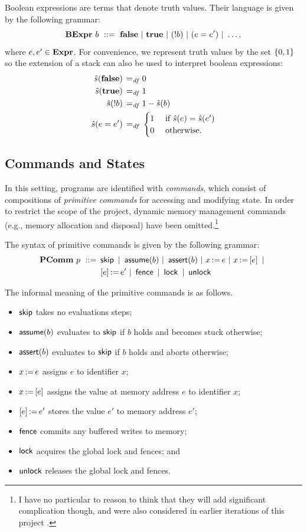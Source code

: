 \documentclass[11pt]{article}
\begin{document}
Boolean expressions are terms that denote truth values. Their language is given by the following grammar: \[ \mathbf{BExpr}~b ~::=~ \mathbf{false} ~|~ \mathbf{true} ~|~ (!b) ~|~ (e = e') ~|~ \ldots, \] where $e,e' \in \mathbf{Expr}$. For convenience, we represent truth values by the set $\left\lbrace 0,1 \right\rbrace$ so the extension of a stack can also be used to interpret boolean expressions: \begin{align*}
	\hat{s}(\mathbf{false}) \operatorname{\;=_{\mathit{df}}\;} & 0 \\
	\hat{s}(\mathbf{true}) \operatorname{\;=_{\mathit{df}}\;} & 1 \\
	\hat{s}(!b) \operatorname{\;=_{\mathit{df}}\;} & 1 - \hat{s}(b) \\
	\hat{s}(e = e') \operatorname{\;=_{\mathit{df}}\;} & \begin{cases}
		1 &\text{ if } \hat{s}(e) = \hat{s}(e')\\
		0 &\text{ otherwise.}
	\end{cases}
\end{align*}

\subsection{Commands and States}

In this setting, programs are identified with \emph{commands}, which consist of compositions of \emph{primitive commands} for accessing and modifying state. In order to restrict the scope of the project, dynamic memory management commands (e.g., memory allocation and disposal) have been omitted.\footnote{I have no particular to reason to think that they will add significant complication though, and were also considered in earlier iterations of this project \cite{wmsldetails,lola11}.}

The syntax of primitive commands is given by the following grammar: \begin{align*} \mathbf{PComm}~p ~::=~ & \operatorname{\mathsf{skip}} ~|~ \operatorname{\mathsf{assume}}(b) ~|~ \operatorname{\mathsf{assert}}(b) ~|~ x \operatorname{:\!=} e ~|~ x \operatorname{:\!=} \left[ e \right] ~|~ \\ 
	& \left[ e \right] \operatorname{:\!=} e' ~|~ \operatorname{\mathsf{fence}} ~|~ \operatorname{\mathsf{lock}} ~|~ \operatorname{\mathsf{unlock}} 	
\end{align*}

The informal meaning of the primitive commands is as follows. \begin{itemize}
	\item $\operatorname{\mathsf{skip}}$ takes no evaluations steps;
	\item $\operatorname{\mathsf{assume}}(b)$ evaluates to $\operatorname{\mathsf{skip}}$ if $b$ holds and becomes stuck otherwise; 
	\item $\operatorname{\mathsf{assert}}(b)$ evaluates to $\operatorname{\mathsf{skip}}$ if $b$ holds and aborts otherwise;
	\item $x \operatorname{:\!=} e$ assigns $e$ to identifier $x$; 
	\item $x \operatorname{:\!=} \left[ e \right]$ assigns the value at memory address $e$ to identifier $x$; 
	\item $\left[ e \right] \operatorname{:\!=} e'$ stores the value $e'$ to memory address $e'$; 
	\item $\operatorname{\mathsf{fence}}$ commits any buffered writes to memory; 
	\item $\operatorname{\mathsf{lock}}$ acquires the global lock and fences; and
	\item $\operatorname{\mathsf{unlock}}$ releases the global lock and fences.
\end{itemize}
\end{document}
